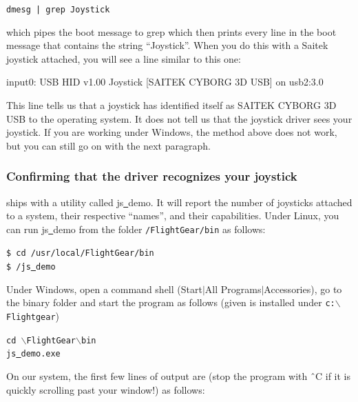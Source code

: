 	\texttt{dmesg | grep Joystick}
\medskip

\noindent
which pipes the boot message to grep which then prints every line in the
boot message that contains the string ``Joystick''.  When you do this with a
Saitek joystick attached, you will see a line similar to this one:
\medskip

\begin{ttfamily}
\noindent
   input0: USB HID v1.00 Joystick [SAITEK CYBORG 3D USB] on usb2:3.0
\end{ttfamily}
\medskip

\noindent
This line tells us that a joystick has identified itself as SAITEK CYBORG 3D USB to the operating system.  It does not tell us that the joystick driver sees your joystick. If you are working under Windows, the method above does not work, but you can still go on with the next paragraph.

\subsubsection{Confirming that the driver recognizes your joystick\label{confirming}}
\FlightGear{} ships with a utility called js\underline{~}demo. It will report the number of joysticks attached to a system, their respective ``names'', and their capabilities. Under Linux, you can run js\underline{~}demo from the folder \texttt{/FlightGear/bin} as follows:
\medskip

\noindent
	\texttt{\$ cd /usr/local/FlightGear/bin}\\
	\texttt{\$ \./js\underline{~}demo}
\medskip

\noindent
Under Windows, open a command shell (Start$\left|\right.$All Programs$\left|\right.$Accessories), go to the \FlightGear{} binary folder and start the program as follows (given \FlightGear{} is installed under \texttt{c:$\backslash$Flightgear})
\medskip

\noindent
	\texttt{cd {$\backslash$}FlightGear{$\backslash$}bin}\\
	\texttt{js\underline{~}demo.exe}
\medskip

On our system, the first few lines of output are (stop the program with \^{~}C if it is quickly scrolling  past your window!) as follows:
\medskip


